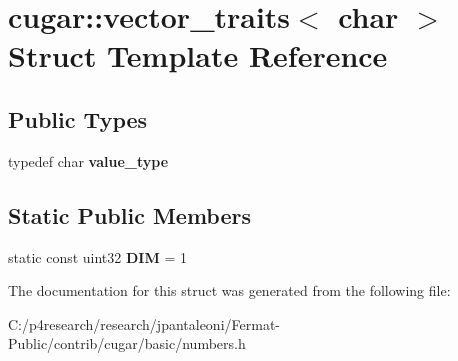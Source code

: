 \hypertarget{structcugar_1_1vector__traits_3_01char_01_4}{}\section{cugar\+:\+:vector\+\_\+traits$<$ char $>$ Struct Template Reference}
\label{structcugar_1_1vector__traits_3_01char_01_4}
\subsection*{Public Types}
\begin{DoxyCompactItemize}
\item 
\mbox{\label{structcugar_1_1vector__traits_3_01char_01_4_afea24be4562c61018bd90f09dd6894fb}} 
typedef char {\bfseries value\+\_\+type}
\end{DoxyCompactItemize}
\subsection*{Static Public Members}
\begin{DoxyCompactItemize}
\item 
\mbox{\label{structcugar_1_1vector__traits_3_01char_01_4_ad7eb94b5877d97f789ce87e928c97b7b}} 
static const uint32 {\bfseries D\+IM} = 1
\end{DoxyCompactItemize}


The documentation for this struct was generated from the following file\+:\begin{DoxyCompactItemize}
\item 
C\+:/p4research/research/jpantaleoni/\+Fermat-\/\+Public/contrib/cugar/basic/numbers.\+h\end{DoxyCompactItemize}
